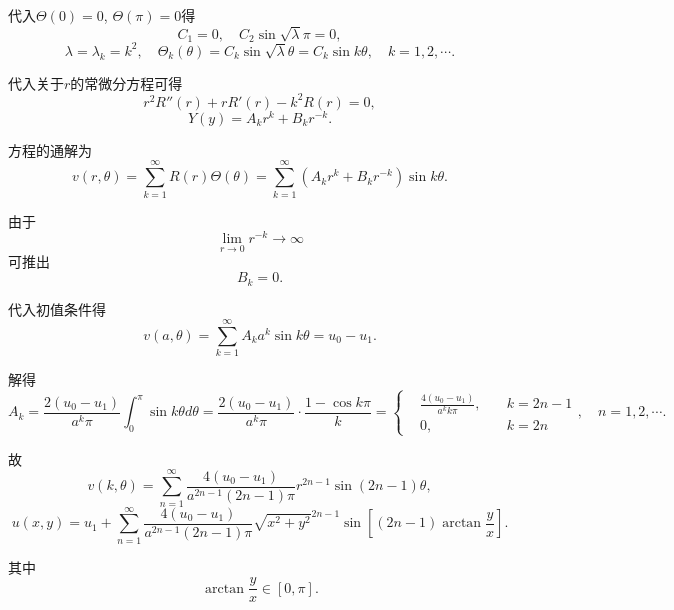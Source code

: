 \documentclass[11pt,a4paper]{article}
\begin{document}
代入$\Theta(0)=0$, $\Theta(\pi)=0$得
$$C_1=0,\quad C_2\sin\sqrt{\lambda}\pi=0,$$
$$\lambda=\lambda_k=k^2,\quad \Theta_k(\theta)=C_k\sin\sqrt{\lambda}\theta=C_k\sin k\theta,\quad k=1,2,\cdots.$$

代入关于$r$的常微分方程可得
$$r^2R''(r)+rR'(r)-k^2R(r)=0,$$
$$Y(y)=A_kr^k+B_kr^{-k}.$$

方程的通解为
$$v(r,\theta)=\sum_{k=1}^\infty R(r)\Theta(\theta)=\sum_{k=1}^\infty\left(A_kr^k+B_kr^{-k}\right)\sin k\theta.$$

由于
$$\lim_{r\to0}r^{-k}\to\infty$$
可推出
$$B_k=0.$$

代入初值条件得
$$v(a,\theta)=\sum_{k=1}^\infty A_ka^k\sin k\theta=u_0-u_1.$$

解得
$$A_k=\frac{2(u_0-u_1)}{a^k\pi}\int_0^\pi\sin k\theta d \theta=\frac{2(u_0-u_1)}{a^k\pi}\cdot\frac{1-\cos k\pi}{k}=\left\{\begin{aligned}
     & \frac{4(u_0-u_1)}{a^kk\pi}, & \quad k=2n-1 \\
     & 0,                          & \quad k=2n
  \end{aligned}\right.,\quad n=1,2,\cdots.$$

故
$$v(k,\theta)=\sum_{n=1}^\infty \frac{4(u_0-u_1)}{a^{2n-1}(2n-1)\pi}r^{2n-1}\sin(2n-1)\theta,$$
$$u(x,y)=u_1+\sum_{n=1}^\infty \frac{4(u_0-u_1)}{a^{2n-1}(2n-1)\pi}\sqrt{x^2+y^2}^{2n-1}\sin\left[(2n-1)\arctan\frac{y}{x}\right].$$

其中
$$\arctan\frac{y}{x}\in[0,\pi].$$
\end{document}
